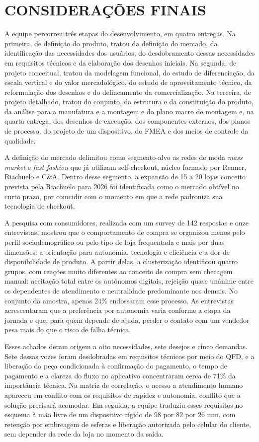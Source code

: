 \section{CONSIDERAÇÕES FINAIS}
\label{sec:consideracoes_finais}

A equipe percorreu três etapas do desenvolvimento, em quatro entregas. Na primeira, de definição do produto, tratou da definição do mercado, da identificação das necessidades dos usuários, do desdobramento dessas necessidades em requisitos técnicos e da elaboração dos desenhos iniciais. Na segunda, de projeto conceitual, tratou da modelagem funcional, do estudo de diferenciação, da escala vertical e do valor mercadológico, do estudo de aproveitamento técnico, da reformulação dos desenhos e do delineamento da comercialização. Na terceira, de projeto detalhado, tratou do conjunto, da estrutura e da constituição do produto, da análise para a manufatura e a montagem e do plano macro de montagem e, na quarta entrega, dos desenhos de execução, dos componentes externos, dos planos de processo, do projeto de um dispositivo, do FMEA e dos meios de controle da qualidade.

A definição do mercado delimitou como segmento-alvo as redes de moda \textit{mass market} e \textit{fast fashion} que já utilizam self-checkout, núcleo formado por Renner, Riachuelo e C\&A. Dentro desse segmento, a expansão de 15 a 20 lojas conceito prevista pela Riachuelo para 2026 foi identificada como o mercado obtível no curto prazo, por coincidir com o momento em que a rede padroniza sua tecnologia de checkout.

A pesquisa com consumidores, realizada com um survey de 142 respostas e onze entrevistas, mostrou que o comportamento de compra se organizou menos pelo perfil sociodemográfico ou pelo tipo de loja frequentada e mais por duas dimensões: a orientação para autonomia, tecnologia e eficiência e a dor de disponibilidade de produto. A partir delas, a clusterização identificou quatro grupos, com reações muito diferentes ao conceito de compra sem checagem manual: aceitação total entre os autônomos digitais, rejeição quase unânime entre os dependentes de atendimento e neutralidade predominante nos demais. No conjunto da amostra, apenas 24\% endossaram esse processo. As entrevistas acrescentaram que a preferência por autonomia varia conforme a etapa da jornada e que, para quem depende de ajuda, perder o contato com um vendedor pesa mais do que o risco de falha técnica.

Esses achados deram origem a oito necessidades, sete desejos e cinco demandas. Sete dessas vozes foram desdobradas em requisitos técnicos por meio do QFD, e a liberação da peça condicionada à confirmação do pagamento, o tempo de pagamento e a clareza do fluxo no aplicativo concentraram cerca de 71\% da importância técnica. Na matriz de correlação, o acesso a atendimento humano apareceu em conflito com os requisitos de rapidez e autonomia, conflito que a solução precisará acomodar. Em seguida, a equipe traduziu esses requisitos no esquema à mão livre de um dispositivo rígido de 98 por 82 por 26 mm, com retenção por embreagem de esferas e liberação autorizada pelo celular do cliente, sem depender da rede da loja no momento da saída.

